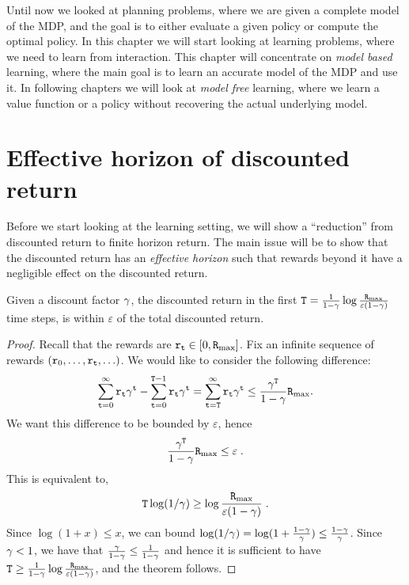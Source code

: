 Until now we looked at planning problems, where we are given a
complete model of the MDP, and the goal is to either evaluate a
given policy or compute the optimal policy. In this chapter we will
start looking at learning problems, where we need to learn from
interaction. This chapter will concentrate on {\em model based}
learning, where the main goal is to learn an accurate model of the
MDP and use it. In following chapters we will look at {\em model
free} learning, where we learn a value function or a policy without
recovering the actual underlying model.

\section{Effective horizon of discounted return}

Before we start looking at the learning setting, we will show a
``reduction'' from discounted return to finite horizon return. The
main issue will be to show that the discounted return has an {\em
effective horizon} such that rewards beyond it have a negligible
effect on the discounted return.

\begin{theorem}
\label{thm:disc-effective-horizon}
%
Given a discount factor $\gamma$, the discounted
return in the first ${\tt T}=\frac{1}{1-\gamma}\log
\frac{{\tt R}_{\max }}{\varepsilon(1-\gamma)}$ time steps, is within
$\varepsilon$ of the total discounted return.
\end{theorem}

\begin{proof}
Recall that the rewards are ${\tt r}_{\tt t} \in [0,{\tt R}_{\max }]$. Fix an
infinite sequence of rewards $({\tt r}_0, \ldots , {\tt r}_{\tt t},
\ldots)$. We would like to consider the following difference:
\begin{align*}
\sum_{{\tt t}=0}^\infty {\tt r}_{\tt t} \gamma^{\tt t} -
\sum_{{\tt t}=0}^{{\tt T}-1} {\tt r}_{\tt t} \gamma^{\tt t} =
\sum_{{\tt t}={\tt T}}^\infty {\tt r}_{\tt t} \gamma^{\tt t} \leq
\frac{\gamma^{\tt T}}{1-\gamma}{\tt R}_{\max }.
\end{align*}
We want this difference to be bounded by $\varepsilon$, hence
\[
\frac{\gamma^{\tt T}}{1-\gamma}{\tt R}_{\max }\leq \varepsilon\;.
\]
This is equivalent to,
\[
{\tt T}\log (1/\gamma) \geq \log
\frac{{\tt R}_{\max }}{\varepsilon(1-\gamma)}\;.
\]
Since $\log(1+x)\leq x$, we can bound $\log (1/\gamma)= \log (
1+\frac{1-\gamma}{\gamma} )\leq
\frac{1-\gamma}{\gamma}$. Since $\gamma< 1$, we have that
$\frac{\gamma}{1-\gamma} \leq \frac{1}{1-\gamma}$ and hence
it is sufficient to have ${\tt T}\geq \frac{1}{1-\gamma}\log
\frac{{\tt R}_{\max }}{\varepsilon(1-\gamma)} $, and the theorem follows.
\end{proof}

